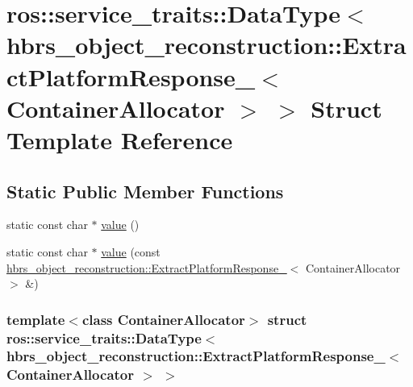 \hypertarget{structros_1_1service__traits_1_1_data_type_3_01hbrs__object__reconstruction_1_1_extract_platform96012c45555fcb89c9d012d6b196000a}{\section{ros\-:\-:service\-\_\-traits\-:\-:\-Data\-Type$<$ hbrs\-\_\-object\-\_\-reconstruction\-:\-:\-Extract\-Platform\-Response\-\_\-$<$ \-Container\-Allocator $>$ $>$ \-Struct \-Template \-Reference}
\label{structros_1_1service__traits_1_1_data_type_3_01hbrs__object__reconstruction_1_1_extract_platform96012c45555fcb89c9d012d6b196000a}
}
\subsection*{\-Static \-Public \-Member \-Functions}
\begin{DoxyCompactItemize}
\item 
static const char $\ast$ \hyperlink{structros_1_1service__traits_1_1_data_type_3_01hbrs__object__reconstruction_1_1_extract_platform96012c45555fcb89c9d012d6b196000a_a74bcf321b1cb41d66f6754094e557c5d}{value} ()
\item 
static const char $\ast$ \hyperlink{structros_1_1service__traits_1_1_data_type_3_01hbrs__object__reconstruction_1_1_extract_platform96012c45555fcb89c9d012d6b196000a_ab7dd461c80786aacf46e4a2beabda695}{value} (const \hyperlink{structhbrs__object__reconstruction_1_1_extract_platform_response__}{hbrs\-\_\-object\-\_\-reconstruction\-::\-Extract\-Platform\-Response\-\_\-}$<$ \-Container\-Allocator $>$ \&)
\end{DoxyCompactItemize}
\subsubsection*{template$<$class Container\-Allocator$>$ struct ros\-::service\-\_\-traits\-::\-Data\-Type$<$ hbrs\-\_\-object\-\_\-reconstruction\-::\-Extract\-Platform\-Response\-\_\-$<$ Container\-Allocator $>$ $>$}



